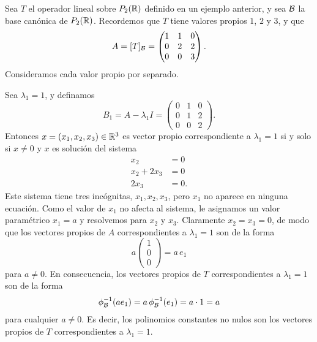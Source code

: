 \documentclass[12pt,a4paper]{book}
\begin{document}
    \begin{ejemplo}
        Sea $T$ el operador lineal sobre $P_2(\mathbb{R})$ definido en un ejemplo anterior, y sea $\mathcal{B}$ la base canónica de $P_2(\mathbb{R})$. Recordemos que $T$ tiene valores propios $1$, $2$ y $3$, y que
        \begin{equation*}
            A = [T]_{\mathcal{B}} = \begin{pmatrix} 1 & 1 & 0 \\ 0 & 2 & 2 \\ 0 & 0 & 3 \end{pmatrix}.
        \end{equation*}
        Consideramos cada valor propio por separado.

        Sea $\lambda_1 = 1$, y definamos
        \begin{equation*}
            B_1 = A - \lambda_1 I = \begin{pmatrix} 0 & 1 & 0 \\ 0 & 1 & 2 \\ 0 & 0 & 2 \end{pmatrix}.
        \end{equation*}
        Entonces $x = (x_1,x_2,x_3) \in \mathbb{R}^3$ es vector propio correspondiente a $\lambda_1 = 1$ si y solo si $x \neq 0$ y $x$ es solución del sistema
        \begin{align*}
            x_2 &= 0 \\
            x_2 + 2x_3 &= 0 \\
            2x_3 &= 0.
        \end{align*}
        Este sistema tiene tres incógnitas, $x_1, x_2, x_3$, pero $x_1$ no aparece en ninguna ecuación. Como el valor de $x_1$ no afecta al sistema, le asignamos un valor paramétrico $x_1 = a$ y resolvemos para $x_2$ y $x_3$. Claramente $x_2 = x_3 = 0$, de modo que los vectores propios de $A$ correspondientes a $\lambda_1 = 1$ son de la forma
        \begin{equation*}
            a\begin{pmatrix} 1 \\ 0 \\ 0 \end{pmatrix} = a\, e_1
        \end{equation*}
        para $a \neq 0$. En consecuencia, los vectores propios de $T$ correspondientes a $\lambda_1 = 1$ son de la forma
        \begin{equation*}
            \phi_{\mathcal{B}}^{-1}(a e_1) = a\, \phi_{\mathcal{B}}^{-1}(e_1) = a \cdot 1 = a
        \end{equation*}
        para cualquier $a \neq 0$. Es decir, los polinomios constantes no nulos son los vectores propios de $T$ correspondientes a $\lambda_1 = 1$.


\end{ejemplo}
\end{document}
